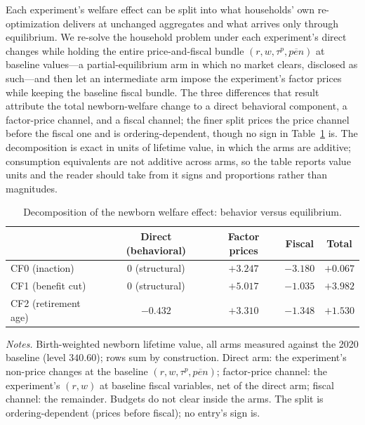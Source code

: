 \documentclass[12pt,a4paper]{article}
\begin{document}
Each experiment's welfare effect can be split into what households' own re-optimization delivers at unchanged aggregates and what arrives only through equilibrium. We re-solve the household problem under each experiment's direct changes while holding the entire price-and-fiscal bundle $(r, w, \tau^p, \overline{pen})$ at baseline values---a partial-equilibrium arm in which no market clears, disclosed as such---and then let an intermediate arm impose the experiment's factor prices while keeping the baseline fiscal bundle. The three differences that result attribute the total newborn-welfare change to a direct behavioral component, a factor-price channel, and a fiscal channel; the finer split prices the price channel before the fiscal one and is ordering-dependent, though no sign in Table~\ref{tab:cf_decomposition} is. The decomposition is exact in units of lifetime value, in which the arms are additive; consumption equivalents are not additive across arms, so the table reports value units and the reader should take from it signs and proportions rather than magnitudes.

\begin{table}[H]
\centering
\caption{Decomposition of the newborn welfare effect: behavior versus equilibrium.}
\label{tab:cf_decomposition}
\begin{tabular}{lcccc}
\toprule
 & Direct (behavioral) & Factor prices & Fiscal & Total \\
\midrule
CF0 (inaction)        & $0$ (structural) & $+3.247$ & $-3.180$ & $+0.067$ \\
CF1 (benefit cut)     & $0$ (structural) & $+5.017$ & $-1.035$ & $+3.982$ \\
CF2 (retirement age)  & $-0.432$         & $+3.310$ & $-1.348$ & $+1.530$ \\
\bottomrule
\end{tabular}
\vspace{0.5em}
\begin{minipage}{0.92\textwidth}
\footnotesize \textit{Notes.} Birth-weighted newborn lifetime value, all arms measured against the 2020 baseline (level $340.60$); rows sum by construction. Direct arm: the experiment's non-price changes at the baseline $(r, w, \tau^p, \overline{pen})$; factor-price channel: the experiment's $(r,w)$ at baseline fiscal variables, net of the direct arm; fiscal channel: the remainder. Budgets do not clear inside the arms. The split is ordering-dependent (prices before fiscal); no entry's sign is.
\end{minipage}
\end{table}
\end{document}
